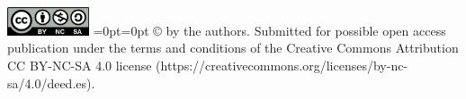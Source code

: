 \documentclass{article}
\begin{document}
\newpage
\printbibliography



\vspace{1cm}
\vbox{\noindent
\includegraphics[width=0.18\textwidth]{logo-cc-by-nc-sa}}
=0pt=0pt
\hangindent=33mm\vspace{-4mm} 
\small
\copyright{}{\@ \the\year} by the authors. Submitted for possible open access publication under the terms and conditions of the Creative Commons Attribution CC BY-NC-SA 4.0 license (https://creativecommons.org/licenses/by-nc-sa/4.0/deed.es).
\end{document}
